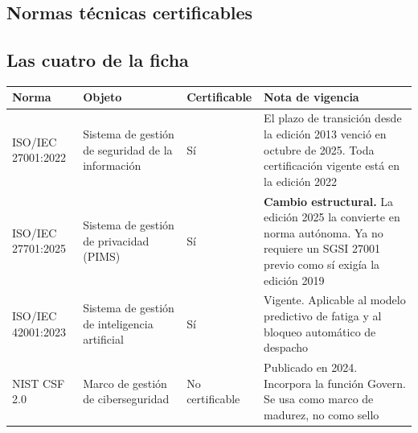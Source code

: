 \subsection{Normas técnicas certificables}\label{normas-tuxe9cnicas-certificables}

\subsection{Las cuatro de la ficha}\label{las-cuatro-de-la-ficha}

{\def\LTcaptype{none} %
\begin{longtable}[]{@{}
  >{\raggedright\arraybackslash}p{}
  >{\raggedright\arraybackslash}p{}
  >{\centering\arraybackslash}p{}
  >{\raggedright\arraybackslash}p{}@{}}
\toprule\noalign{}
\begin{minipage}[b]{\linewidth}\raggedright
Norma
\end{minipage} & \begin{minipage}[b]{\linewidth}\raggedright
Objeto
\end{minipage} & \begin{minipage}[b]{\linewidth}\centering
Certificable
\end{minipage} & \begin{minipage}[b]{\linewidth}\raggedright
Nota de vigencia
\end{minipage} \\
\midrule\noalign{}
\endhead
\bottomrule\noalign{}
\endlastfoot
ISO/IEC 27001:2022 & Sistema de gestión de seguridad de la información & Sí & El plazo de transición desde la edición 2013 venció en octubre de 2025. Toda certificación vigente está en la edición 2022 \\
ISO/IEC 27701:2025 & Sistema de gestión de privacidad (PIMS) & Sí & \textbf{Cambio estructural.} La edición 2025 la convierte en norma autónoma. Ya no requiere un SGSI 27001 previo como sí exigía la edición 2019 \\
ISO/IEC 42001:2023 & Sistema de gestión de inteligencia artificial & Sí & Vigente. Aplicable al modelo predictivo de fatiga y al bloqueo automático de despacho \\
NIST CSF 2.0 & Marco de gestión de ciberseguridad & No certificable & Publicado en 2024. Incorpora la función Govern. Se usa como marco de madurez, no como sello \\
\end{longtable}
}

